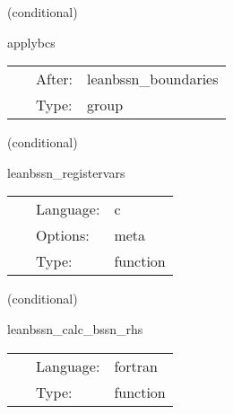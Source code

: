 \vspace{5mm}

   (conditional) 

\hspace{5mm} applybcs 

\hspace{5mm}{\it apply boundary conditions } 


\hspace{5mm}

 \begin{tabular*}{160mm}{cll} 
~ & After:  & leanbssn\_boundaries \\ 
~ & Type:  & group \\ 
\end{tabular*} 


\vspace{5mm}

   (conditional) 

\hspace{5mm} leanbssn\_registervars 

\hspace{5mm}{\it register variables for mol } 


\hspace{5mm}

 \begin{tabular*}{160mm}{cll} 
~ & Language:  & c \\ 
~ & Options:  & meta \\ 
~ & Type:  & function \\ 
\end{tabular*} 


\vspace{5mm}

   (conditional) 

\hspace{5mm} leanbssn\_calc\_bssn\_rhs 

\hspace{5mm}{\it mol rhs calculation } 


\hspace{5mm}

 \begin{tabular*}{160mm}{cll} 
~ & Language:  & fortran \\ 
~ & Type:  & function \\ 
\end{tabular*} 


\vspace{5mm}


